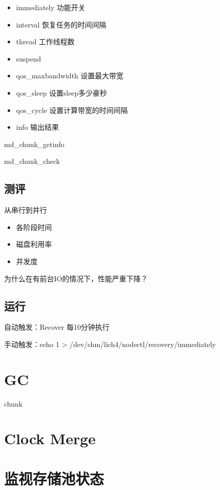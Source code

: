 \begin{itemize}
\item immediately       功能开关
\item interval          恢复任务的时间间隔
\item thread            工作线程数
\item suspend
\item qos\_maxbandwidth 设置最大带宽
\item qos\_sleep        设置sleep多少豪秒
\item qos\_cycle        设置计算带宽的时间间隔
\item info              输出结果
\end{itemize}

md\_chunk\_getinfo

md\_chunk\_check

\subsection{测评}

从串行到并行

\begin{itemize}
\item 各阶段时间
\item 磁盘利用率
\item 并发度
\end{itemize}

为什么在有前台IO的情况下，性能严重下降？

\subsection{运行}

\begin{tcolorbox}
    自动触发：Recover 每10分钟执行

    手动触发：echo 1 > /dev/shm/lich4/nodectl/recovery/immediately
\end{tcolorbox}

\section{GC}

chunk

\section{Clock Merge}

\section{监视存储池状态}

